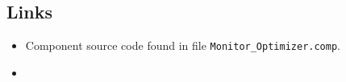 \subsection*{Links}
\begin{itemize}
  \item Component source code found in file \texttt{Monitor\_Optimizer.comp}.
  \item {}
\end{itemize}
